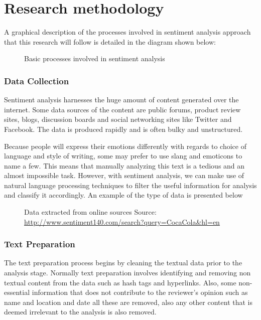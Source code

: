 \chapter{Research methodology}

A graphical description of the processes involved in sentiment analysis approach that this research will follow is detailed in the diagram shown below:

\begin{figure}[h]
  \centering
  \caption[Sentiment analysis process]
  {Basic processes involved in sentiment analysis}
  \label{fig:ALAP:sm3}
\end{figure}


\subsection{Data Collection}
Sentiment analysis harnesses the huge amount of content generated over the internet. Some data sources of the content are public forums, product review sites, blogs, discussion boards and social networking sites like Twitter and Facebook.
The data is produced rapidly and is often bulky and unstructured.

Because people will express their emotions differently with regards to choice of language and style of writing, some may prefer to use slang and emoticons to name a few. This means that manually analyzing this text is a tedious and an almost impossible task.
\clearpage
However, with sentiment analysis, we can make use of natural language processing techniques to filter the useful information for analysis and classify it accordingly. An example of the type of data is presented below



\begin{figure}[h]
  \centering
  \caption[sample tweets]
  {Data extracted from online sources Source: \url{http://www.sentiment140.com/search?query=CocaCola&hl=en}  }
  \label{fig:ALAP:sm1}
\end{figure}


\subsection{Text Preparation}
The text preparation process begins by cleaning the textual data prior to the analysis stage. Normally text preparation involves identifying and removing non textual content from the data such as hash tags and hyperlinks. Also, some non-essential information that does not contribute to the reviewer's opinion such as name and location and date all these are removed, also any other content that is deemed irrelevant to the analysis is also removed.

